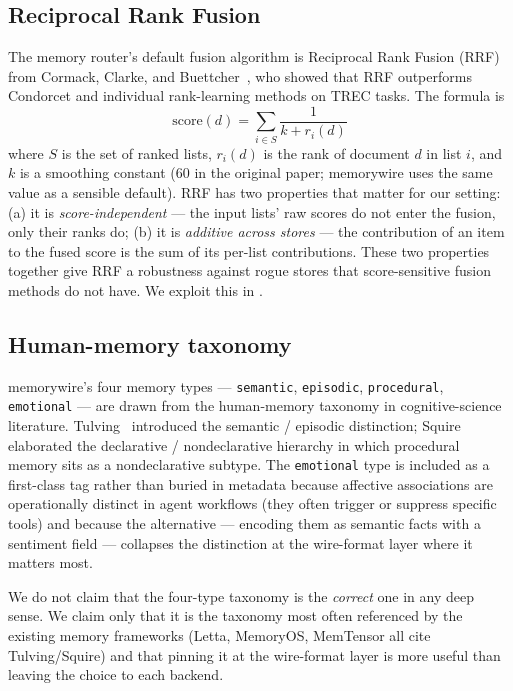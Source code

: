 \documentclass[11pt,letterpaper,twocolumn]{article}
\begin{document}
\subsection{Reciprocal Rank Fusion}
\label{sec:related-rrf}

The memory router's default fusion algorithm is Reciprocal Rank Fusion (RRF) from Cormack, Clarke, and Buettcher~\cite{cormack2009rrf}, who showed that RRF outperforms Condorcet and individual rank-learning methods on TREC tasks. The formula is
\[
  \mathrm{score}(d) = \sum_{i \in S} \frac{1}{k + r_i(d)}
\]
where $S$ is the set of ranked lists, $r_i(d)$ is the rank of document $d$ in list $i$, and $k$ is a smoothing constant (60 in the original paper; memorywire uses the same value as a sensible default). RRF has two properties that matter for our setting: (a) it is \emph{score-independent} --- the input lists' raw scores do not enter the fusion, only their ranks do; (b) it is \emph{additive across stores} --- the contribution of an item to the fused score is the sum of its per-list contributions. These two properties together give RRF a robustness against rogue stores that score-sensitive fusion methods do not have. We exploit this in .

\subsection{Human-memory taxonomy}

memorywire's four memory types --- \texttt{semantic}, \texttt{episodic}, \texttt{procedural}, \texttt{emotional} --- are drawn from the human-memory taxonomy in cognitive-science literature. Tulving~\cite{tulving1972episodic} introduced the semantic / episodic distinction; Squire~\cite{squire1992declarative} elaborated the declarative / nondeclarative hierarchy in which procedural memory sits as a nondeclarative subtype. The \texttt{emotional} type is included as a first-class tag rather than buried in metadata because affective associations are operationally distinct in agent workflows (they often trigger or suppress specific tools) and because the alternative --- encoding them as semantic facts with a sentiment field --- collapses the distinction at the wire-format layer where it matters most.

We do not claim that the four-type taxonomy is the \emph{correct} one in any deep sense. We claim only that it is the taxonomy most often referenced by the existing memory frameworks (Letta, MemoryOS, MemTensor all cite Tulving/Squire) and that pinning it at the wire-format layer is more useful than leaving the choice to each backend.
\end{document}
